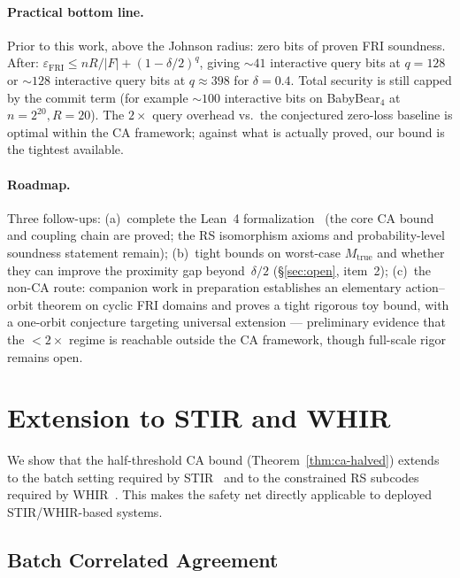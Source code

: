 \documentclass[11pt]{article}
\begin{document}
\paragraph{Practical bottom line.}
Prior to this work, above the Johnson radius: zero bits of proven FRI soundness. After: $\varepsilon_{\mathrm{FRI}} \leq nR/|F| + (1{-}\delta/2)^q$, giving ${\sim}41$ interactive query bits at $q = 128$ or ${\sim}128$ interactive query bits at $q \approx 398$ for $\delta=0.4$. Total security is still capped by the commit term (for example ${\sim}100$ interactive bits on BabyBear$_4$ at $n=2^{20}, R=20$). The $2\times$ query overhead vs.\ the conjectured zero-loss baseline is optimal within the CA framework; against what is actually proved, our bound is the tightest available.

\paragraph{Roadmap.}
Three follow-ups: (a)~complete the Lean~4 formalization~\cite{CompanionRepo} (the core CA bound and coupling chain are proved; the RS isomorphism axioms and probability-level soundness statement remain); (b)~tight bounds on worst-case $M_{\mathrm{true}}$ and whether they can improve the proximity gap beyond~$\delta/2$ (\S\ref{sec:open}, item~2); (c)~the non-CA route: companion work in preparation establishes an elementary action--orbit theorem on cyclic FRI domains and proves a tight rigorous toy bound, with a one-orbit conjecture targeting universal extension --- preliminary evidence that the $<2\times$ regime is reachable outside the CA framework, though full-scale rigor remains open.


\appendix

\section{Extension to STIR and WHIR}
\label{app:stir}

We show that the half-threshold CA bound (Theorem~\ref{thm:ca-halved}) extends to the batch setting required by STIR~\cite{STIR} and to the constrained RS subcodes required by WHIR~\cite{WHIR}. This makes the safety net directly applicable to deployed STIR/WHIR-based systems.

\subsection{Batch Correlated Agreement}
\end{document}
